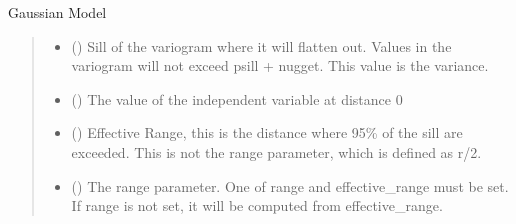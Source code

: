 \documentclass[letterpaper,10pt,english]{sphinxmanual}
\begin{document}

\begin{fulllineitems}
\label{\detokenize{covariance:glomar_gridding.variogram.GaussianVariogram}}
\pysigstartsignatures
\pysiglinewithargsret
{}
{\sphinxparamcomma {}\sphinxparamcomma {}\sphinxparamcomma {}}
{}
\pysigstopsignatures
\sphinxAtStartPar
Gaussian Model
\begin{quote}\begin{description}
\begin{itemize}
\item {}
\sphinxAtStartPar
{} (\sphinxstyleliteralemphasis{\sphinxupquote{ | }}) \textendash{} Sill of the variogram where it will flatten out. Values in the variogram
will not exceed psill + nugget. This value is the variance.

\item {}
\sphinxAtStartPar
{} (\sphinxstyleliteralemphasis{\sphinxupquote{ | }}) \textendash{} The value of the independent variable at distance 0

\item {}
\sphinxAtStartPar
{} (\sphinxstyleliteralemphasis{\sphinxupquote{ | }}\sphinxstyleliteralemphasis{\sphinxupquote{ | }}) \textendash{} Effective Range, this is the distance where 95\% of the sill are
exceeded. This is not the range parameter, which is defined as r/2.

\item {}
\sphinxAtStartPar
{} (\sphinxstyleliteralemphasis{\sphinxupquote{ | }}\sphinxstyleliteralemphasis{\sphinxupquote{ | }}) \textendash{} The range parameter. One of range and effective\_range must be set. If
range is not set, it will be computed from effective\_range.


\end{itemize}
\end{description}
\end{quote}
\end{fulllineitems}
\end{document}
